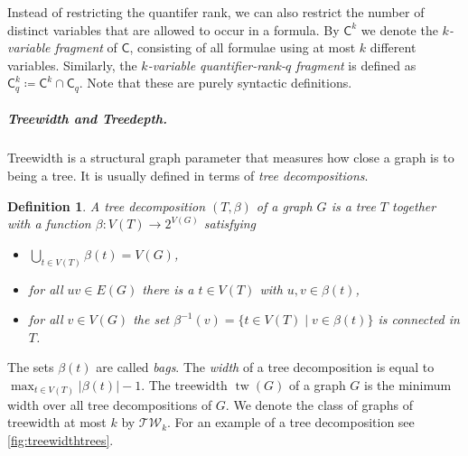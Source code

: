 \documentclass[10pt,a4paper]{article}
\newtheorem{definition}[theorem]{Definition}
\newcommand{\TW}{\ensuremath{\mathcal{TW}}}
\newcommand{\lC} {\ensuremath{\mathsf C}}
\DeclareMathOperator{\tw}{tw}
\begin{document}
Instead of restricting the quantifer rank, we can also restrict the number of distinct variables that are allowed to occur in a formula. By $\lC^k$ we denote the \emph{$k$-variable fragment} of $\lC$, consisting of all formulae using at most $k$ different variables. Similarly, the \emph{$k$-variable quantifier-rank-$q$ fragment} is defined as $\lC^k_q \coloneqq \lC^k \cap \lC_q$. Note that these are purely syntactic definitions.

\subparagraph{Treewidth and Treedepth.}
Treewidth is a structural graph parameter that measures how close a graph is to being a tree. It is usually defined in terms of \emph{tree decompositions}.
\begin{definition}\label{def:treedecomp}
  A tree decomposition $(T, \beta)$ of a graph $G$ is a tree $T$ together with a function $\beta \colon V(T) \to 2^{V(G)}$ satisfying
  \begin{itemize}
  \item $\bigcup_{t \in V(T)} \beta(t) = V(G)$,
  \item for all $uv \in E(G)$ there is a $t \in V(T)$ with $u, v \in \beta(t)$,
  \item for all $v \in V(G)$ the set $\beta^{-1}(v) = \{t \in V(T) \mid v \in \beta(t)  \}$ is connected in $T$.
  \end{itemize}
\end{definition}

The sets $\beta(t)$ are called \emph{bags}. The \emph{width} of a tree decomposition is equal to $\max_{t \in V(T)}|\beta(t)|-1$. The treewidth $\tw(G)$ of a graph $G$ is the minimum width over all tree decompositions of $G$. We denote the class of graphs of treewidth at most $k$ by $\TW_k$. For an example of a tree decomposition see \cref{fig:treewidthtrees}.
\end{document}
